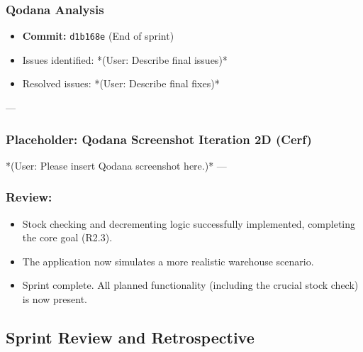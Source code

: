 	\subsubsection{Qodana Analysis}
	\begin{itemize}
		\item \textbf{Commit:} \verb|d1b168e| (End of sprint)
		\item Issues identified: *(User: Describe final issues)*
		\item Resolved issues: *(User: Describe final fixes)*
	\end{itemize}
	
	--- %
	\subsubsection*{Placeholder: Qodana Screenshot Iteration 2D (Cerf)}
	*(User: Please insert Qodana screenshot here.)*
	---
	
	\subsubsection{Review:}
	\begin{itemize}
		\item Stock checking and decrementing logic successfully implemented, completing the core goal (R2.3).
		\item The application now simulates a more realistic warehouse scenario.
		\item Sprint complete. All planned functionality (including the crucial stock check) is now present.
	\end{itemize}
	
	\clearpage

\subsection{Sprint Review and Retrospective}
	
